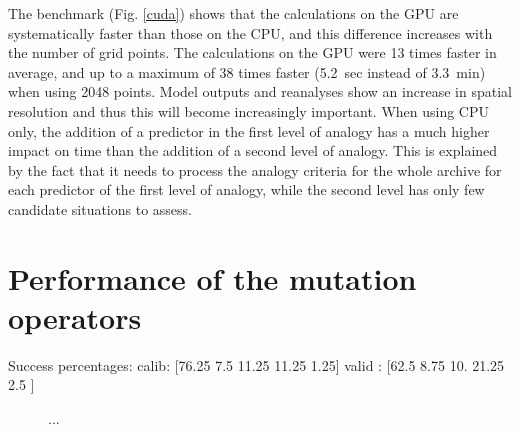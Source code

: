 \documentclass[draft]{agujournal2019}
\begin{document}
The benchmark (Fig. \ref{cuda}) shows that the calculations on the GPU are systematically faster than those on the CPU, and this difference increases with the number of grid points. The calculations on the GPU were 13 times faster in average, and up to a maximum of 38 times faster (5.2~sec instead of 3.3~min) when using 2048 points. Model outputs and reanalyses show an increase in spatial resolution and thus this will become increasingly important. When using CPU only, the addition of a predictor in the first level of analogy has a much higher impact on time than the addition of a second level of analogy. This is explained by the fact that it needs to process the analogy criteria for the whole archive for each predictor of the first level of analogy, while the second level has only few candidate situations to assess.



\section{Performance of the mutation operators}


Success percentages:
calib: [76.25  7.5  11.25 11.25  1.25]
valid : [62.5   8.75 10.   21.25  2.5 ]

\begin{figure}
	\noindent{}
	\caption{...}
	\label{fig_mutation_operators_perfs}
\end{figure}
\end{document}
